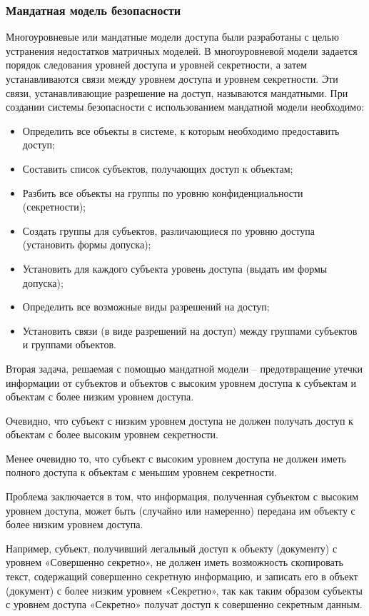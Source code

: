 \subsubsection{Мандатная модель безопасности}

Многоуровневые или мандатные модели доступа были разработаны с целью устранения недостатков матричных моделей.
В многоуровневой модели задается порядок следования уровней доступа и уровней секретности, а затем устанавливаются связи между уровнем доступа и уровнем секретности.
Эти связи, устанавливающие разрешение на доступ, называются мандатными.
При создании системы безопасности с использованием мандатной модели необходимо:
\begin{itemize}
    \item Определить все объекты в системе, к которым необходимо предоставить доступ;
    \item Составить список субъектов, получающих доступ к объектам;
    \item Разбить все объекты на группы по уровню конфиденциальности (секретности);
    \item Создать группы для субъектов, различающиеся по уровню доступа (установить формы допуска);
    \item Установить для каждого субъекта уровень доступа (выдать им формы допуска);
    \item Определить все возможные виды разрешений на доступ;
    \item Установить связи (в виде разрешений на доступ) между группами субъектов и группами объектов.
\end{itemize}
Вторая задача, решаемая с помощью мандатной модели – предотвращение утечки информации от субъектов и объектов с высоким уровнем доступа к субъектам и объектам с более низким уровнем доступа.

Очевидно, что субъект с низким уровнем доступа не должен получать
доступ к объектам с более высоким уровнем секретности.

Менее очевидно то, что субъект с высоким уровнем доступа не должен иметь полного доступа к объектам с меньшим уровнем секретности.

Проблема заключается в том, что информация, полученная субъектом с высоким уровнем доступа, может быть (случайно или намеренно) передана им объекту с более низким уровнем доступа.

Например, субъект, получивший легальный доступ к объекту (документу) с уровнем «Совершенно секретно», не должен иметь возможность скопировать текст, содержащий совершенно секретную информацию, и записать его в объект (документ) с более низким уровнем «Секретно», так как таким образом субъекты с уровнем доступа «Секретно» получат доступ к совершенно секретным данным. 

